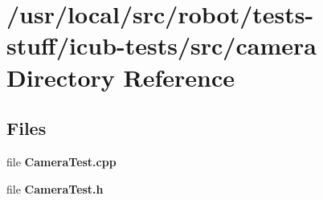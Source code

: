 \section{/usr/local/src/robot/tests-\/stuff/icub-\/tests/src/camera Directory Reference}
\label{dir_066d661332cb63d818aab860f4a82024}
\subsection*{Files}
\begin{DoxyCompactItemize}
\item 
file {\bfseries Camera\-Test.\-cpp}
\item 
file {\bfseries Camera\-Test.\-h}
\end{DoxyCompactItemize}
